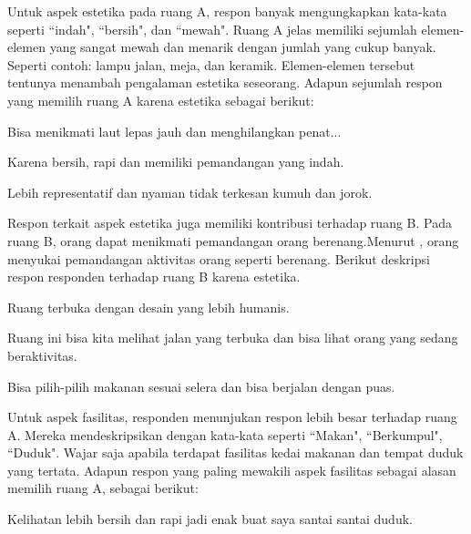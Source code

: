 \documentclass[11pt]{simartadv} %
\begin{document}
Untuk aspek estetika pada ruang A, respon banyak mengungkapkan kata-kata seperti ``indah", ``bersih", dan ``mewah". Ruang A jelas memiliki sejumlah elemen-elemen yang sangat mewah dan menarik dengan jumlah yang cukup banyak. Seperti contoh: lampu jalan, meja, dan keramik. Elemen-elemen tersebut tentunya menambah pengalaman estetika seseorang. Adapun sejumlah respon yang memilih ruang A karena estetika sebagai berikut:

\begin{quoting}
   Bisa menikmati laut lepas jauh dan menghilangkan penat...
\end{quoting}

\begin{quoting}
    Karena bersih, rapi dan memiliki pemandangan yang indah.
\end{quoting}

\begin{quoting}
    Lebih representatif dan nyaman tidak terkesan kumuh dan jorok.
\end{quoting}

Respon terkait aspek estetika juga memiliki kontribusi terhadap ruang B. Pada ruang B, orang dapat menikmati pemandangan orang berenang.Menurut \cite{mumcu2016}, orang menyukai pemandangan aktivitas orang seperti berenang. Berikut deskripsi respon responden terhadap ruang B karena estetika.

\begin{quoting}
    Ruang terbuka dengan desain yang lebih humanis.
\end{quoting}

\begin{quoting}
    Ruang ini bisa kita melihat jalan yang terbuka dan bisa lihat orang yang sedang beraktivitas.
\end{quoting}

\begin{quoting}
    Bisa pilih-pilih makanan sesuai selera dan bisa berjalan dengan puas.
\end{quoting}

Untuk aspek fasilitas, responden menunjukan respon lebih besar terhadap ruang A. Mereka mendeskripsikan dengan kata-kata seperti ``Makan", ``Berkumpul", ``Duduk". Wajar saja apabila terdapat fasilitas kedai makanan dan tempat duduk yang tertata. Adapun respon yang paling mewakili aspek fasilitas sebagai alasan memilih ruang A, sebagai berikut:

\begin{quoting}
    Kelihatan lebih bersih dan rapi jadi enak buat saya santai santai duduk.
\end{quoting}
\end{document}
